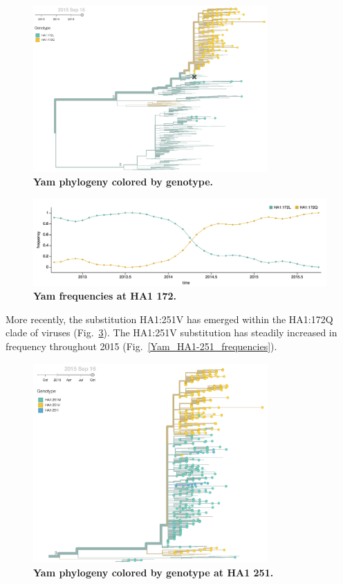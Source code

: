 \documentclass[11pt,oneside,letterpaper]{article}
\begin{document}
\begin{figure}[h!]
	\centering		
	\includegraphics[width=0.8\textwidth]{../figures/sep-2015/Yam_HA1-172.png}
	\caption{\textbf{Yam phylogeny colored by genotype.} 
	}
	\label{Yam_HA1-172}
\end{figure}

\begin{figure}[h!]
	\centering		
	\includegraphics[width=1.0\textwidth]{../figures/sep-2015/Yam_HA1-172_frequencies.png}
	\caption{\textbf{Yam frequencies at HA1 172.} 
	}
	\label{Yam_HA1-172_frequencies}
\end{figure}

More recently, the substitution HA1:251V has emerged within the HA1:172Q clade of viruses (Fig.~\ref{Yam_HA1-251}). The HA1:251V substitution has steadily increased in frequency throughout 2015 (Fig.~\ref{Yam_HA1-251_frequencies}).

\begin{figure}[h!]
	\centering		
	\includegraphics[width=0.8\textwidth]{../figures/sep-2015/Yam_HA1-251.png}
	\caption{\textbf{Yam phylogeny colored by genotype at HA1 251.} 
	}
	\label{Yam_HA1-251}
\end{figure}
\end{document}
